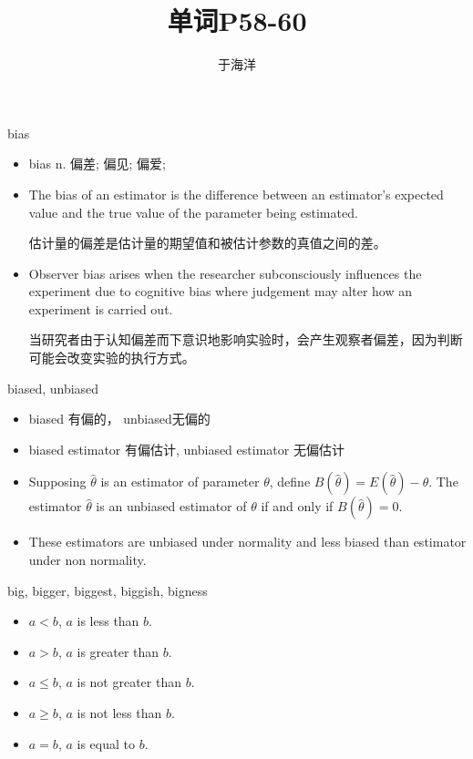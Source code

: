 \documentclass[10pt]{beamer}
\begin{document}
\title{单词P58-60}
\author{{\fangsong 于海洋}}
\frame{\titlepage}
\begin{frame}{bias}


\begin{itemize}
\item{bias   n. {\fangsong 偏差; 偏见; 偏爱;}}
\item{The {\color{magenta} bias} of an estimator is the difference between an estimator's expected value and the true value of the parameter being estimated. }

{估计量的{\color{magenta}偏差}是估计量的期望值和被估计参数的真值之间的差。}

\item{Observer {\color{magenta} bias} arises when the researcher subconsciously influences the experiment due to cognitive {\color{magenta} bias} where judgement may alter how an experiment is carried out.}

{当研究者由于认知{\color{magenta}偏差}而下意识地影响实验时，会产生观察者{\color{magenta}偏差}，因为判断可能会改变实验的执行方式。}
\end{itemize}

\end{frame}


\begin{frame}{biased, unbiased}
\begin{itemize}
\item{biased {\fangsong 有偏的}， unbiased{\fangsong 无偏的}}
\item{biased estimator {\fangsong 有偏估计},  unbiased estimator {\fangsong 无偏估计}}
\end{itemize}

\begin{small}
\begin{itemize}

\item{Supposing $\hat{\theta}$  is an estimator of parameter $\theta$, define $B(\hat{\theta})=E(\hat{\theta})-\theta$.
The estimator $\hat{\theta}$
 is an unbiased estimator of $\theta$ if and only if $B(\hat{\theta})=0$.
}
\item{These estimators are unbiased under normality and less biased than estimator under non normality.}
\end{itemize}
\end{small}
\end{frame}


\begin{frame}{big, bigger, biggest, biggish, bigness}
\begin{itemize}
\item{$a<b$, $a$ is less than $b$.}
\item{$a>b$, $a$ is greater than $b$.}
\item{$a\leq b$, $a$ is not greater than $b$.}
\item{$a\geq b$, $a$ is not less than $b$.}
\item{$a=b$, $a$ is equal to $b$.}
\end{itemize}


\end{frame}
\end{document}
